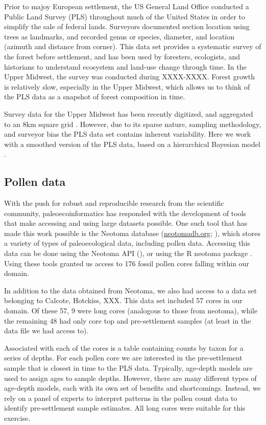 \documentclass[12pt]{article}
\begin{document}
Prior to majoy European settlement, the US General
Land Office conducted a Public Land Survey (PLS) throughout much of
the United States in order to simplify the sale of federal
lands. Surveyors documented section location using trees as landmarks,
and recorded genus or species, diameter, and location (azimuth and
distance from corner). This data set provides a systematic survey of
the forest before settlement, and has been used by foresters,
ecologists, and historians to understand ecosystem and land-use change
through time. In the Upper Midwest, the survey was conducted during
XXXX-XXXX. Forest growth is relatively slow, especially in the Upper
Midwest, which allows us to think of the PLS data as a snapshot of
forest composition in time.

Survey data for the Upper Midwest has been recently
digitized, and aggregated to an 8km square grid \cite{XXX}. However,
due to its sparse nature, sampling methodology, and surveyor bias the
PLS data set contains inherent variability. Here we work with a
smoothed version of the PLS data, based on a hierarchical Bayesian
model \cite{XXX}.

\subsection{Pollen data}
With the push for robust and reproducible research from the scientific
community, paleoecoinformatics has responded with the development of
tools that make accessing and using large datasets possible. One such
tool that has made this work possible is the Neotoma database
(\url{neotomadb.org}; \cite{XXX}), which stores a variety of types of
paleoecological data, including pollen data. Accessing this data can
be done using the Neotoma API (), or using the R neotoma package
\cite{XXX}. Using these tools granted us access to 176 fossil pollen
cores falling within our domain.

In addition to the data obtained from Neotoma, we also had access to a
data set belonging to Calcote, Hotckiss, XXX. This data set included
57 cores in our domain. Of these 57, 9 were long cores (analogous to
those from neotoma), while the remaining 48 had only core top and
pre-settlement samples (at least in the data file we had access to).

Associated with each of the cores is a table containing counts by
taxon for a series of depths. For each pollen core we are interested
in the pre-settlement sample that is closest in time to the PLS
data. Typically, age-depth models are used to assign ages to sample
depths. However, there are many different types of age-depth models,
each with its own set of benefits and shortcomings. Instead, we rely
on a panel of experts to interpret patterns in the pollen count data
to identify pre-settlement sample estimates. All long cores were
suitable for this exercise.
\end{document}
